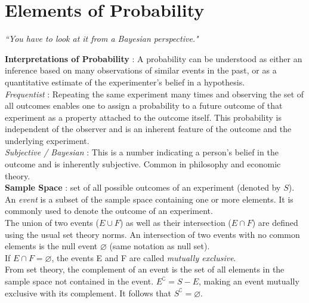 \chapter{Elements of Probability}


\begin{flushright}
	\textit{``You have to look at it from a Bayesian perspective."} \\
\end{flushright}

\textbf{Interpretations of Probability} : A probability can be understood as either an inference based on many observations of similar events in the past, or as a quantitative estimate of the experimenter's belief in a hypothesis. \\

\textit{Frequentist} : Repeating the same experiment many times and observing the set of all outcomes enables one to assign a probability to a future outcome of that experiment as a property attached to the outcome itself. This probability is independent of the observer and is an inherent feature of the outcome and the underlying experiment. \\

\textit{Subjective / Bayesian} : This is a number indicating a person's belief in the outcome and is inherently subjective. Common in philosophy and economic theory. \\

\textbf{Sample Space} : set of all possible outcomes of an experiment (denoted by $ S $). An \textit{event} is a subset of the sample space containing one or more elements. It is commonly used to denote the outcome of an experiment.  \\

The union of two events ($ E \cup F $) as well as their intersection ($ E \cap F $) are defined using the usual set theory norms. An intersection of two events with no common elements is the null event $ \varnothing $ (same notation as null set). \\

If $ E \cap F = \varnothing $, the events E and F are called \textit{mutually exclusive}. \\

From set theory, the complement of an event is the set of all elements in the sample space not contained in the event. $ E^{\complement}  = S - E$, making an event mutually exclusive with its complement. It follows that $ S^{\complement} = \varnothing $. \\

